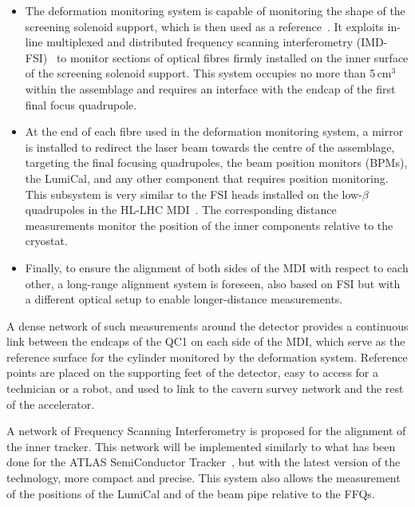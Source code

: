 \begin{itemize} 

\item The deformation monitoring system is capable of monitoring the shape of the screening solenoid support, 
which is then used as a reference~\cite{Watrelot_2023}. 
It exploits 
in-line multiplexed and distributed frequency scanning interferometry (IMD-FSI)~\cite{10.1117/12.2529157} 
to monitor sections of optical fibres firmly installed on the inner surface of the screening solenoid support.
This system occupies no more than 5\,cm$^{3}$ within the assemblage and requires an interface with the endcap of the first final focus quadrupole.

\item At the end of each fibre used in the deformation monitoring system, 
a mirror is installed to redirect the laser beam towards the centre of the assemblage, 
targeting the final focusing quadrupoles, the beam position monitors (BPMs), the LumiCal, 
and any other component that requires position monitoring. 
This subsystem is very similar to the FSI heads installed on the low-$\beta$ quadrupoles in the HL-LHC MDI~\cite{MainaudDurand:2667534}. 
The corresponding distance measurements monitor the position of the inner components relative to the cryostat. 
 
\item Finally, to ensure the alignment of both sides of the MDI with respect to each other, 
a long-range alignment system is foreseen, also based on FSI but with a different optical setup to enable longer-distance measurements. 

\end{itemize} 

A dense network of such measurements around the detector provides a continuous link between the endcaps of the QC1 on each side of the MDI, 
which serve as the reference surface for the cylinder monitored by the deformation system. 
Reference points are placed on the supporting feet of the detector, 
easy to access for a technician or a robot, 
and used to link to the cavern survey network and the rest of the accelerator.

A network of Frequency Scanning Interferometry is proposed for the alignment of the inner tracker. 
This network will be implemented similarly to what has been done for the ATLAS SemiConductor Tracker~\cite{gibson2006multi}, 
but with the latest version of the technology, more compact and precise. 
This system also allows the measurement of the positions of the LumiCal and of the beam pipe relative to the FFQs.

